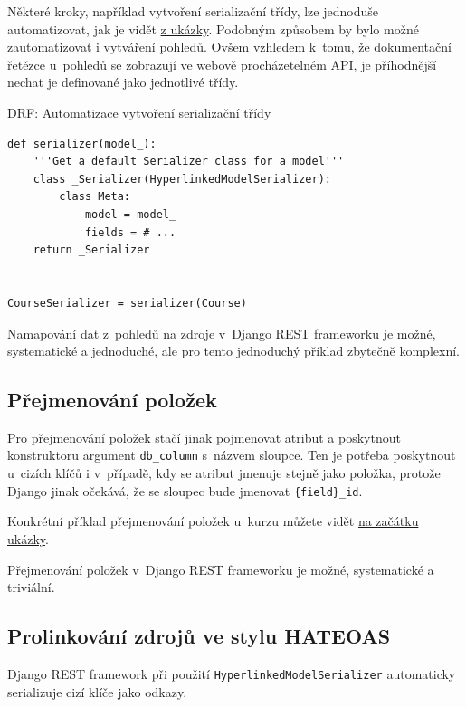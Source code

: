 Některé kroky, například vytvoření serializační třídy, lze jednoduše automatizovat, jak je vidět \protect\hyperlink{code:drf:serializer}{z ukázky}. Podobným způsobem by bylo možné zautomatizovat i vytváření pohledů. Ovšem vzhledem k~tomu, že dokumentační řetězce u~pohledů se zobrazují ve webově procházetelném API, je příhodnější nechat je definované jako jednotlivé třídy.

\begin{listing}[htbp]
\caption{{\label{code:drf:serializer}DRF: Automatizace vytvoření serializační třídy}}
\begin{verbatim}
def serializer(model_):
    '''Get a default Serializer class for a model'''
    class _Serializer(HyperlinkedModelSerializer):
        class Meta:
            model = model_
            fields = # ...
    return _Serializer


CourseSerializer = serializer(Course)
\end{verbatim}
\end{listing}

Namapování dat z~pohledů na zdroje v~Django REST frameworku je možné, systematické a jednoduché, ale pro tento jednoduchý příklad zbytečně komplexní.

\subsection{Přejmenování položek}\label{pux159ejmenovuxe1nuxed-poloux17eek}

Pro přejmenování položek stačí jinak pojmenovat atribut a poskytnout konstruktoru argument \verb!db_column! s~názvem sloupce. Ten je potřeba poskytnout u~cizích klíčů i v~případě, kdy se atribut jmenuje stejně jako položka, protože Django jinak očekává, že se sloupec bude jmenovat \verb!{field}_id!.

Konkrétní příklad přejmenování položek u~kurzu můžete vidět \protect\hyperlink{code:drf:mapping}{na začátku ukázky}.

Přejmenování položek v~Django REST frameworku je možné, systematické a triviální.

\subsection{Prolinkování zdrojů ve stylu HATEOAS}\label{prolinkovuxe1nuxed-zdrojux16f-ve-stylu-hateoas}

Django REST framework při použití \verb!HyperlinkedModelSerializer! automaticky serializuje cizí klíče jako odkazy.


